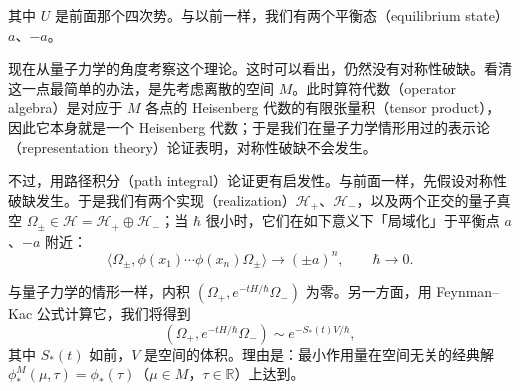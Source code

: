 
其中 $U$ 是前面那个四次势。与以前一样，我们有两个平衡态（equilibrium state）$a$、$-a$。

现在从量子力学的角度考察这个理论。这时可以看出，仍然没有对称性破缺。看清这一点最简单的办法，是先考虑离散的空间 $M$。此时算符代数（operator algebra）是对应于 $M$ 各点的 Heisenberg 代数的有限张量积（tensor product），因此它本身就是一个 Heisenberg 代数；于是我们在量子力学情形用过的表示论（representation theory）论证表明，对称性破缺不会发生。


不过，用路径积分（path integral）论证更有启发性。与前面一样，先假设对称性破缺发生。于是我们有两个实现（realization）$\mathcal{H}_+$、$\mathcal{H}_-$，以及两个正交的量子真空 $\Omega_\pm\in\mathcal{H}=\mathcal{H}_+\oplus\mathcal{H}_-$；当 $\hbar$ 很小时，它们在如下意义下「局域化」于平衡点 $a$、$-a$ 附近：
\[
\langle\Omega_\pm,\phi(x_1)\cdots\phi(x_n)\Omega_\pm\rangle\to(\pm a)^n,\qquad \hbar\to0 .
\]

与量子力学的情形一样，内积 $(\Omega_+,e^{-tH/\hbar}\Omega_-)$ 为零。另一方面，用 Feynman–Kac 公式计算它，我们将得到
\begin{equation}
  \tag{1.9}
  \label{eq:1-9}
  (\Omega_+,e^{-tH/\hbar}\Omega_-)\sim e^{-S_*(t)V/\hbar},
\end{equation}
其中 $S_*(t)$ 如前，$V$ 是空间的体积。理由是：最小作用量在空间无关的经典解 $\phi^M_*(\mu,\tau)=\phi_*(\tau)$（$\mu\in M$，$\tau\in\mathbb{R}$）上达到。


